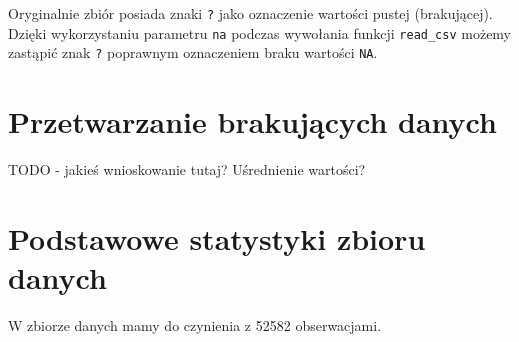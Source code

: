 \documentclass[]{article}
\begin{document}
Oryginalnie zbiór posiada znaki \texttt{?} jako oznaczenie wartości
pustej (brakującej). Dzięki wykorzystaniu parametru \texttt{na} podczas
wywołania funkcji \texttt{read\_csv} możemy zastąpić znak \texttt{?}
poprawnym oznaczeniem braku wartości \texttt{NA}.

\hypertarget{przetwarzanie-brakujux105cych-danych}{%
\section{Przetwarzanie brakujących
danych}\label{przetwarzanie-brakujux105cych-danych}}

TODO - jakieś wnioskowanie tutaj? Uśrednienie wartości?

\hypertarget{podstawowe-statystyki-zbioru-danych}{%
\section{Podstawowe statystyki zbioru
danych}\label{podstawowe-statystyki-zbioru-danych}}

W zbiorze danych mamy do czynienia z 52582 obserwacjami.
\end{document}
